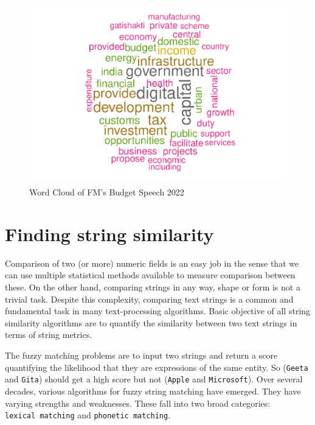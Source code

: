\documentclass[
]{book}
\begin{document}
\begin{figure}

{\centering \includegraphics{DauR_files/figure-latex/wordcloud-1} 

}

\caption{Word Cloud of FM's Budget Speech 2022}\label{fig:wordcloud}
\end{figure}

\hypertarget{finding-string-similarity}{%
\chapter{Finding string similarity}\label{finding-string-similarity}}

Comparison of two (or more) numeric fields is an easy job in the sense that we can use multiple statistical methods available to measure comparison between these. On the other hand, comparing strings in any way, shape or form is not a trivial task. Despite this complexity, comparing text strings is a common and fundamental task in many text-processing algorithms. Basic objective of all string similarity algorithms are to quantify the similarity between two text strings in terms of string metrics.

The fuzzy matching problems are to input two strings and return a score quantifying the likelihood that they are expressions of the same entity. So (\texttt{Geeta} and \texttt{Gita}) should get a high score but not (\texttt{Apple} and \texttt{Microsoft}). Over several decades, various algorithms for fuzzy string matching have emerged. They have varying strengths and weaknesses. These fall into two broad categories: \texttt{lexical\ matching} and \texttt{phonetic\ matching}.
\end{document}
